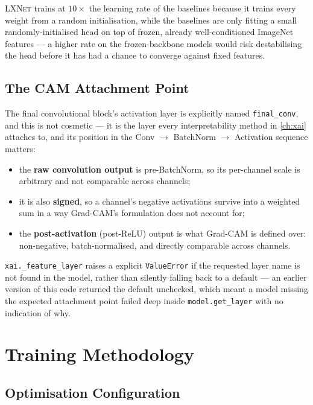 \documentclass[11pt,a4paper,oneside]{report}
\newcommand{\LXNet}{\textsc{LXNet}}
\newcommand{\code}[1]{\texttt{\small #1}}
\begin{document}
\LXNet{} trains at $10\times$ the learning rate of the baselines because it
trains every weight from a random initialisation, while the baselines are
only fitting a small randomly-initialised head on top of frozen, already
well-conditioned ImageNet features --- a higher rate on the frozen-backbone
models would risk destabilising the head before it has had a chance to
converge against fixed features.

\section{The CAM Attachment Point}
\label{sec:cam-attachment}

The final convolutional block's activation layer is explicitly named
\code{final\_conv}, and this is not cosmetic --- it is the layer every
interpretability method in \cref{ch:xai} attaches to, and its position in the
Conv $\to$ BatchNorm $\to$ Activation sequence matters:

\begin{itemize}
\item the \textbf{raw convolution output} is pre-BatchNorm, so its
  per-channel scale is arbitrary and not comparable across channels;
\item it is also \textbf{signed}, so a channel's negative activations survive
  into a weighted sum in a way Grad-CAM's formulation does not account for;
\item the \textbf{post-activation} (post-ReLU) output is what Grad-CAM
  \cite{selvaraju2017} is defined over: non-negative, batch-normalised, and
  directly comparable across channels.
\end{itemize}

\code{xai.\_feature\_layer} raises a explicit \code{ValueError} if the
requested layer name is not found in the model, rather than silently falling
back to a default --- an earlier version of this code returned the default
unchecked, which meant a model missing the expected attachment point failed
deep inside \code{model.get\_layer} with no indication of why.

\chapter{Training Methodology}
\label{ch:training}

\section{Optimisation Configuration}
\end{document}
